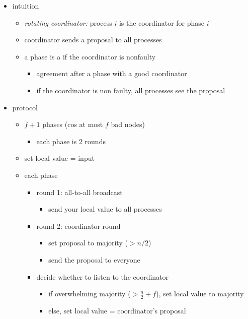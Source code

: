 \documentclass[10pt, landscape]{article}
\begin{document}
\begin{multicols*}{3}
  \begin{itemize}
    \item intuition
      \begin{itemize}
        \item \textit{rotating coordinator:} process $i$ is the coordinator for phase $i$
        \item coordinator sends a proposal to all processes
        \item a phase is a  if the coordinator is nonfaulty
          \begin{itemize}
            \item agreement after a phase with a good coordinator
            \item if the coordinator is non faulty, all processes see the proposal
          \end{itemize}
      \end{itemize}
    \item protocol
      \begin{itemize}
        \item $f+1$ phases (cos at most $f$ bad nodes)
          \begin{itemize}
            \item each phase is 2 rounds
          \end{itemize}
        \item set local value = input
        \item each phase
          \begin{itemize}
            \item round 1: all-to-all broadcast
              \begin{itemize}
                \item send your local value to all processes
              \end{itemize}
            \item round 2: coordinator round
              \begin{itemize}
                \item set proposal to majority ($>n/2$)
                \item send the proposal to everyone
              \end{itemize}
            \item decide whether to listen to the coordinator
              \begin{itemize}
                \item if overwhelming majority ($> \frac{n}{2}+f$), set local value to majority
                \item else, set local value = coordinator’s proposal
              \end{itemize}
          \end{itemize}
      \end{itemize}
  \end{itemize}


\end{multicols*}
\end{document}
